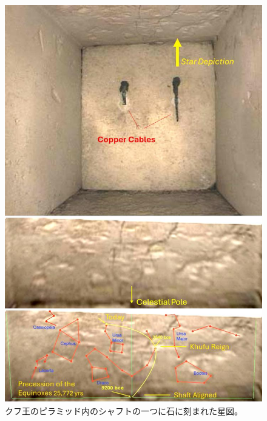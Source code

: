 \documentclass[10pt,twocolumn,letterpaper]{article}
\begin{document}
\begin{figure}[H]
\begin{center}
   \includegraphics[width=1\linewidth]{star-stone.jpg}
\end{center}
   \caption{クフ王のピラミッド内のシャフトの一つに石に刻まれた星図\cite{28}。}
\label{fig:20}
\label{fig:onecol}
\end{figure}
\end{document}
